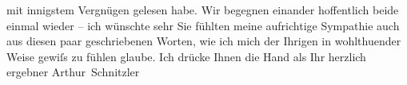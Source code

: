               mit innigstem Vergnügen gelesen habe. Wir begegnen einander hoffentlich beide einmal
               wieder – ich wünschte sehr Sie fühlten meine aufrichtige Sympathie auch aus diesen
               paar geschrie{\pb}benen Worten, wie ich mich
               der Ihrigen in wohlthuender Weise gewiſs zu fühlen glaube. Ich drücke Ihnen die Hand
               als Ihr herzlich ergebner\pend
           \pstart \spacefill\mbox{Arthur Schnitzler}\pend{}\endnumbering{}  \newcommand{\dateiname}{L02416}\newcommand{\titel}{Arthur Schnitzler an Felix Braun, 19. 10. 1924}\newcommand{\editorInnen}{Martin Anton Müller und Gerd-Hermann Susen}
